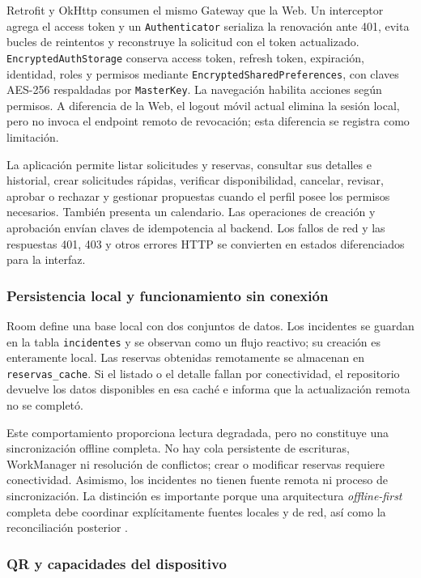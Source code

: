 Retrofit y OkHttp consumen el mismo Gateway que la Web. Un interceptor agrega
el access token y un \texttt{Authenticator} serializa la renovación ante 401,
evita bucles de reintentos y reconstruye la solicitud con el token actualizado.
\texttt{EncryptedAuthStorage} conserva access token, refresh token, expiración,
identidad, roles y permisos mediante \texttt{EncryptedSharedPreferences}, con
claves AES-256 respaldadas por \texttt{MasterKey}. La navegación habilita
acciones según permisos. A diferencia de la Web, el logout móvil actual elimina
la sesión local, pero no invoca el endpoint remoto de revocación; esta diferencia
se registra como limitación.

La aplicación permite listar solicitudes y reservas, consultar sus detalles e
historial, crear solicitudes rápidas, verificar disponibilidad, cancelar,
revisar, aprobar o rechazar y gestionar propuestas cuando el perfil posee los
permisos necesarios. También presenta un calendario. Las operaciones de creación
y aprobación envían claves de idempotencia al backend. Los fallos de red y las
respuestas 401, 403 y otros errores HTTP se convierten en estados diferenciados
para la interfaz.

\subsubsection{Persistencia local y funcionamiento sin conexión}

Room define una base local con dos conjuntos de datos. Los incidentes se guardan
en la tabla \texttt{incidentes} y se observan como un flujo reactivo; su creación
es enteramente local. Las reservas obtenidas remotamente se almacenan en
\texttt{reservas\_cache}. Si el listado o el detalle fallan por conectividad, el
repositorio devuelve los datos disponibles en esa caché e informa que la
actualización remota no se completó.

Este comportamiento proporciona lectura degradada, pero no constituye una
sincronización offline completa. No hay cola persistente de escrituras,
WorkManager ni resolución de conflictos; crear o modificar reservas requiere
conectividad. Asimismo, los incidentes no tienen fuente remota ni proceso de
sincronización. La distinción es importante porque una arquitectura
\emph{offline-first} completa debe coordinar explícitamente fuentes locales y de
red, así como la reconciliación posterior \cite{android2026offlinefirst}.

\subsubsection{QR y capacidades del dispositivo}

